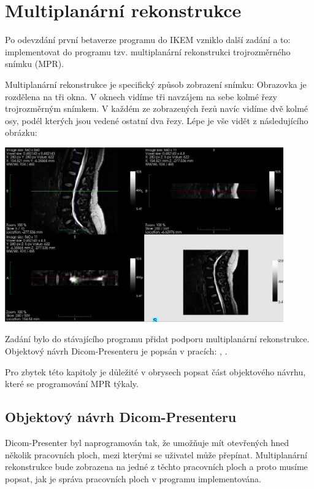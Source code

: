 \section{Multiplanární rekonstrukce}
Po odevzdání první betaverze programu do IKEM vzniklo další zadání a to: implementovat do programu tzv. multiplanární rekonstrukci trojrozměrného snímku (MPR).

Multiplanární rekonstrukce je specifický způsob zobrazení snímku: Obrazovka je rozdělena na tři okna. V oknech vidíme tři navzájem na sebe kolmé řezy trojrozměrným snímkem. V každém ze zobrazených řezů navíc vidíme dvě kolmé osy, podél kterých jsou vedené ostatní dva řezy. Lépe je vše vidět z následujícího obrázku:

\includegraphics[width=0.9\textwidth,height=0.9\textwidth]{Text/IMG/MPR_Medinria.jpg}

Zadání bylo do stávajícího programu přidat podporu multiplanární rekonstrukce. Objektový návrh Dicom-Presenteru je popsán v pracích: \cite{neskudla}, \cite{flaska}.

Pro zbytek této kapitoly je důležité v obrysech popsat část objektového návrhu, které se programování MPR týkaly.

\subsection{Objektový návrh Dicom-Presenteru}
Dicom-Presenter byl naprogramován tak, že umožňuje mít otevřených hned několik pracovních ploch, mezi kterými se uživatel může přepínat. Multiplanární rekonstrukce bude zobrazena na jedné z těchto pracovních ploch a proto musíme popsat, jak je správa pracovních ploch v programu implementována.

